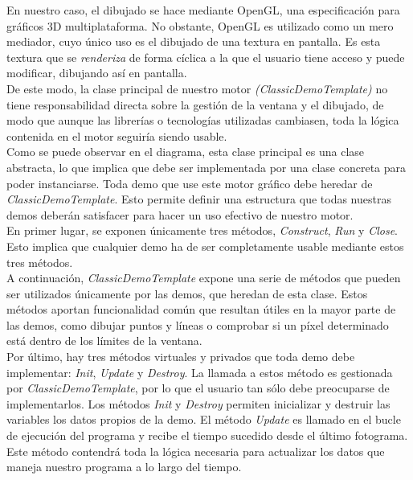 En nuestro caso, el dibujado se hace mediante OpenGL, una especificación para gráficos 3D multiplataforma. No obstante, OpenGL es utilizado como un mero mediador, cuyo único uso es el dibujado de una textura en pantalla. Es esta textura que se \emph{renderiza} de forma cíclica a la que el usuario tiene acceso y puede modificar, dibujando así en pantalla.\\

De este modo, la clase principal de nuestro motor \emph{(ClassicDemoTemplate)} no tiene responsabilidad directa sobre la gestión de la ventana y el dibujado, de modo que aunque las librerías o tecnologías utilizadas cambiasen, toda la lógica contenida en el motor seguiría siendo usable.\\

Como se puede observar en el diagrama, esta clase principal es una clase abstracta, lo que implica que debe ser implementada por una clase concreta para poder instanciarse. Toda demo que use este motor gráfico debe heredar de \emph{ClassicDemoTemplate}. Esto permite definir una estructura que todas nuestras demos deberán satisfacer para hacer un uso efectivo de nuestro motor.\\

En primer lugar, se exponen únicamente tres métodos, \emph{Construct}, \emph{Run} y \emph{Close}. Esto implica que cualquier demo ha de ser completamente usable mediante estos tres métodos.\\

A continuación, \emph{ClassicDemoTemplate} expone una serie de métodos que pueden ser utilizados únicamente por las demos, que heredan de esta clase. Estos métodos aportan funcionalidad común que resultan útiles en la mayor parte de las demos, como dibujar puntos y líneas o comprobar si un píxel determinado está dentro de los límites de la ventana.\\

Por último, hay tres métodos virtuales y privados que toda demo debe implementar: \emph{Init}, \emph{Update} y \emph{Destroy}. La llamada a estos método es gestionada por \emph{ClassicDemoTemplate}, por lo que el usuario tan sólo debe preocuparse de implementarlos. Los métodos \emph{Init} y \emph{Destroy} permiten inicializar y destruir las variables los datos propios de la demo. El método \emph{Update} es llamado en el bucle de ejecución del programa y recibe el tiempo sucedido desde el último fotograma. Este método contendrá toda la lógica necesaria para actualizar los datos que maneja nuestro programa a lo largo del tiempo. 

